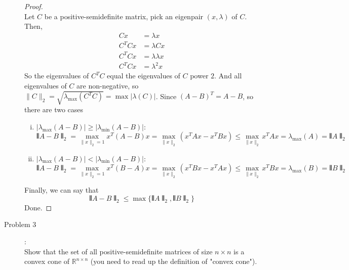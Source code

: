 \documentclass[a4paper]{article}
\begin{document}
\begin{description}
  \begin{proof}\ \\
    Let $C$ be a positive-semidefinite matrix, pick an eigenpair $(x,\lambda)$ of $C$. Then,
    \begin{align*}
      Cx&=\lambda x\\
      C^{T}Cx&=\lambda Cx\\
      C^{T}Cx&=\lambda \lambda x\\
      C^{T}Cx&=\lambda^{2}x
    \end{align*}
    So the eigenvalues of $C^{T}C$ equal the eigenvalues of $C$ power $2$. And all eigenvalues of $C$ are non-negative, so $\|C\|_{2}=\sqrt{\lambda_{\max}(C^{T}C)}=\max{|\lambda(C)|}$.
    Since $(A-B)^{T}=A-B$, so there are two cases
    \begin{enumerate}[i)]
      \item $|\lambda_{\max}(A-B)|\ge |\lambda_{\min}(A-B)|$: $$\interleave A-B\interleave_{2}=\max\limits_{\|x\|_{2}=1}x^{T}(A-B)x=\max\limits_{\|x\|_{2}}(x^{T}Ax-x^{T}Bx)\le \max\limits_{\|x\|_{2}}x^{T}Ax=\lambda_{\max}(A)=\interleave A\interleave_{2}$$
      \item $|\lambda_{\max}(A-B)|< |\lambda_{\min}(A-B)|$:$$\interleave A-B\interleave_{2}=\max\limits_{\|x\|_{2}=1}x^{T}(B-A)x=\max\limits_{\|x\|_{2}}(x^{T}Bx-x^{T}Ax)\le \max\limits_{\|x\|_{2}}x^{T}Bx=\lambda_{\max}(B)=\interleave B\interleave_{2}$$
    \end{enumerate}
    Finally, we can say that $$\interleave A-B\interleave _{2}\le \max\{\interleave A\interleave_{2},\interleave B\interleave_{2}\}$$
    Done.
  \end{proof}

  \item[Problem 3]:\\
  Show that the set of all positive-semidefinite matrices of size $n\times n$ is a convex cone of $\mathbb{R}^{n\times n}$ (you need to read up the definition of "convex cone").


\end{description}
\end{document}
